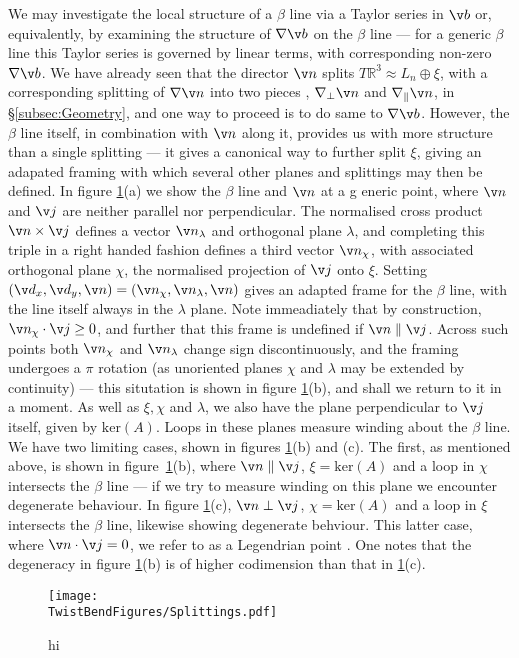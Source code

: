 We may investigate the local structure of a $\beta$ line via a Taylor series in $\v b$ or, equivalently, by examining the structure of $\nabla \v b$ on the $\beta$ line --- for a generic $\beta$ line  this Taylor series is governed by linear terms, with corresponding  non-zero $\nabla \v b$. We have already seen that the director $\v n$ splits $T \mathbb{R}^3\approx L_n \oplus \xi$, with a corresponding splitting of $\nabla \v n$ into two pieces , $\nabla_\perp \v n $ and $\nabla_\parallel \v n$, in \S\ref{subsec:Geometry}, and one way to proceed is to do same to $\nabla \v b$. However, the $\beta$ line itself, in combination with $\v n$ along it, provides us with more structure than a single splitting --- it gives a canonical way to further split $\xi$, giving an adapated framing with which several other planes and splittings may then be defined. In figure \ref{fig:Splittings}(a) we show the $\beta$ line and $\v n$ at a g
eneric point, where $\v n$ and $\v j$ are neither parallel nor perpendicular. 
The normalised cross product $\v n \times \v j$ defines a vector $\v n_\lambda$ and orthogonal plane $\lambda$, and completing this triple in a right handed fashion defines a third vector $\v n_\chi$, with associated orthogonal plane $\chi$, the normalised projection of $\v j$ onto $\xi$. Setting $(\v d_x, \v d_y, \v n) = (\v n_\chi, \v n_\lambda, \v n)$ gives an adapted frame for the $\beta$ line, with the line itself always in the $\lambda$ plane. Note immeadiately that by construction, $\v n_\chi \cdot \v j \geq 0$, and further that this frame is undefined if $\v n \parallel \v j$. Across such points both $\v n_\chi$ and $\v n_\lambda$ change sign discontinuously, and the framing undergoes a $\pi$ rotation (as unoriented planes $\chi$ and $\lambda$ may be extended by continuity) --- this situtation is shown in figure  \ref{fig:Splittings}(b), and shall we return to it in a moment. As well as $\xi, \chi$ and $\lambda$, we also have the plane perpendicular to $\v j$ itself, given by $\mathrm{ker}(A)$. Loops in these planes measure winding about the $\beta$ line. We have two limiting cases, shown in figures \ref{fig:Splittings}(b) and (c). The first, as mentioned above, is shown in figure~\ref{fig:Splittings}(b), where $\v  n \parallel \v j$, $\xi = \mathrm{ker}(A)$ and a loop in $\chi$ intersects the $\beta$ line --- if we try to measure winding on this plane we encounter degenerate behaviour. In figure \ref{fig:Splittings}(c), $\v n \perp \v j$, $\chi = \mathrm{ker}(A)$ and a loop in $\xi$  intersects the $\beta$ line, likewise showing degenerate behviour. This latter case, where $\v n \cdot \v j= 0$, we refer to as a Legendrian point \citep{Geiges}. One notes that the degeneracy in figure \ref{fig:Splittings}(b) is of higher codimension than that in \ref{fig:Splittings}(c).
\begin{figure}[htbp]
    \centering
    \texttt{[image: \\TwistBendFigures/Splittings.pdf]}
    \caption{hi}
    \label{fig:Splittings}
\end{figure}

